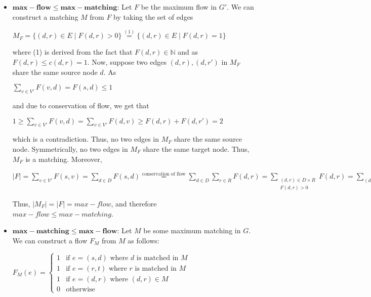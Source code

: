 \documentclass{article}
\begin{document}
\begin{enumerate}[label=(\alph*)]
\begin{enumerate}[label=(\roman*)]
        \begin{itemize}
            \item $\mathbf{max-flow \leq max-matching}$: Let $F$ be the maximum flow in $G'$. We can construct a matching $M$ from $F$ by taking the set of edges 
            
            \begin{center}
            $M_F = \{(d, r) \in E \mid F(d, r) > 0 \} \overset{(1)}{=} \{(d, r) \in E \mid F(d, r) = 1 \}$
            \end{center}
            
            where (1) is derived from the fact that $F(d, r) \in \mathbb{N}$ and as $F(d, r) \leq c(d, r) = 1$. Now, suppose two edges $(d, r), (d, r')$ in $M_F$ share the same source node $d$. As 
            
            \begin{center}
            $\sum_{v \in V'}{F(v, d)} = F(s, d) \leq 1$
            \end{center}
            and due to conservation of flow, we get that 
            
            \begin{center}
            $1 \geq \sum_{v \in V'}{F(v, d)} = \sum_{v \in V'}{F(d, v)} \geq F(d, r) + F(d, r') = 2$
            \end{center}
            which is a contradiction. Thus, no two edges in $M_F$ share the same source node. Symmetrically, no two edges in $M_F$ share the same target node. Thus, $M_F$ is a matching. Moreover, 
            
            \begin{center}
            $|F| = \sum_{v \in V'}{F(s, v)} = \sum_{d \in D}{F(s, d)} \overset{\text{conservation of flow}}{=} \sum_{d \in D}{\sum_{r \in R}{F(d, r)}} = \sum_{\substack{(d, r) \in D \times R \\ F(d, r) > 0}}{F(d, r)} = \sum_{(d, r) \in M_F}{F(d, r)} = \sum_{(d, r) \in M_F}{1} = |M_F|$
            \end{center}
            Thus, $|M_F| = |F| = max-flow$, and therefore $max-flow \leq max-matching$.

            \item $\mathbf{max-matching \leq max-flow}$: Let $M$ be some maximum matching in $G$. We can construct a flow $F_M$ from $M$ as follows:
        
            \begin{center}
                $F_M(e) = \begin{cases}
                    1 & \text{if $e = (s, d)$ where $d$ is matched in $M$}\\
                    1 & \text{if $e = (r, t)$ where $r$ is matched in $M$}\\
                    1 & \text{if $e = (d, r)$ where $(d, r) \in M$}\\
                    0 & \text{otherwise}
                \end{cases}$
            \end{center}
            

\end{itemize}
\end{enumerate}
\end{enumerate}
\end{document}
